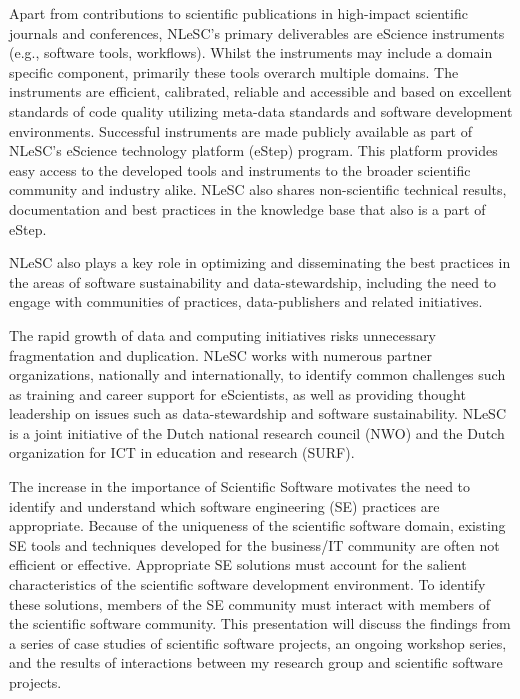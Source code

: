 \documentclass[a4paper,UKenglish]{dagrep}
\begin{document}
Apart from contributions to scientific publications in high-impact
scientific journals and conferences, NLeSC’s primary deliverables are
eScience instruments (e.g., software tools, workflows). Whilst the
instruments may include a domain specific component, primarily these
tools overarch multiple domains. The instruments are efficient,
calibrated, reliable and accessible and based on excellent standards
of code quality utilizing meta-data standards and software development
environments. Successful instruments are made publicly available as
part of NLeSC’s eScience technology platform (eStep) program. This
platform provides easy access to the developed tools and instruments
to the broader scientific community and industry alike. NLeSC also
shares non-scientific technical results, documentation and best
practices in the knowledge base that also is a part of eStep.

NLeSC also plays a key role in optimizing and disseminating the best
practices in the areas of software sustainability and
data-stewardship, including the need to engage with communities of
practices, data-publishers and related initiatives.

The rapid growth of data and computing initiatives risks unnecessary
fragmentation and duplication. NLeSC works with numerous partner
organizations, nationally and internationally, to identify common
challenges such as training and career support for eScientists, as
well as providing thought leadership on issues such as
data-stewardship and software sustainability. NLeSC is a joint
initiative of the Dutch national research council (NWO) and the Dutch
organization for ICT in education and research (SURF).


  
The increase in the importance of Scientific Software motivates the need to identify and understand which software engineering (SE) practices are appropriate. Because of the uniqueness of the scientific software domain, existing SE tools and techniques developed for the business/IT community are often not efficient or effective. Appropriate SE solutions must account for the salient characteristics of the scientific software development environment. To identify these solutions, members of the SE community must interact with members of the scientific software community. This presentation will discuss the findings from a series of case studies of scientific software projects, an ongoing workshop series, and the results of interactions between my research group and scientific software projects.  
  
\end{document}
